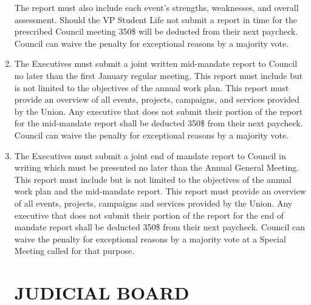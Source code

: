 \documentclass[oneside]{book}
\begin{document}
\begin{enumerate}
The report must also include each event\textquoteright{}s strengths,
weaknesses, and overall assessment. Should the VP Student Life not
submit a report in time for the prescribed Council meeting 350\$ will
be deducted from their next paycheck. Council can waive the penalty
for exceptional reasons by a majority vote.
\item The Executives must submit a joint written mid-mandate report to Council
no later than the first January regular meeting. This report must
include but is not limited to the objectives of the annual work plan.
This report must provide an overview of all events, projects, campaigns,
and services provided by the Union. Any executive that does not submit
their portion of the report for the mid-mandate report shall be deducted
350\$ from their next paycheck. Council can waive the penalty for
exceptional reasons by a majority vote.
\item The Executives must submit a joint end of mandate report to Council
in writing which must be presented no later than the Annual General
Meeting. This report must include but is not limited to the objectives
of the annual work plan and the mid-mandate report. This report must
provide an overview of all events, projects, campaigns and services
provided by the Union. Any executive that does not submit their portion
of the report for the end of mandate report shall be deducted 350\$
from their next paycheck. Council can waive the penalty for exceptional
reasons by a majority vote at a Special Meeting called for that purpose.

\part{\label{JUDICIAL_BOARD}JUDICIAL BOARD }

\end{enumerate}
\end{document}
